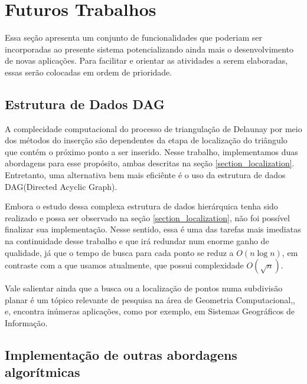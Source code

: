\documentclass[12pt,a4paper]{book}
\begin{document}
\section{Futuros Trabalhos}

Essa se\c{c}\~{a}o apresenta um conjunto de funcionalidades que poderiam ser incorporadas ao presente sistema potencializando ainda mais o desenvolvimento de novas aplica\c{c}\~{o}es. Para facilitar e orientar as atividades a serem elaboradas, essas ser\~ao colocadas em ordem de prioridade.

\subsection{Estrutura de Dados DAG}

A complecidade computacional do processo de triangula\c{c}\~{a}o de Delaunay por meio dos m\'etodos do inser\c{c}\~{a}o s\~ao dependentes da etapa de localiza\c{c}\~{a}o do tri\^angulo que cont\'em o pr\'oximo ponto a ser inserido. Nesse trabalho, implementamos duas abordagens para esse prop\'osito, ambas descritas na se\c{c}\~{a}o \ref{section_localization}. Entretanto, uma alternativa bem mais efici\^ente \'e o uso da estrutura de dados DAG(Directed Acyclic Graph)\cite{guibas}.

Embora o estudo dessa complexa estrutura de dados hier\'arquica tenha sido realizado e possa ser observado na se\c{c}\~{a}o \ref{section_localization}, n\~ao foi poss\'ivel finalizar sua implementa\c{c}\~{a}o. Nesse sentido, essa \'e uma das tarefas mais imediatas na continuidade desse trabalho e que ir\'a redundar num enorme ganho de qualidade, j\'a que o tempo de busca para cada ponto se reduz a $O(n \log n)$, em contraste com a que usamos atualmente, que possui complexidade $O(\sqrt{n})$.

Vale salientar ainda que a busca ou a localiza\c{c}\~{a}o de pontos numa subdivis\~ao planar \'e um t\'opico relevante de pesquisa na \'area de Geometria Computacional\cite{berg},\cite{preparata}, \cite{edelsbrunner2} e, encontra in\'umeras aplica\c{c}\~{o}es, como por exemplo, em Sistemas Geogr\'aficos de Informa\c{c}\~{a}o.

\subsection{Implementa\c{c}\~{a}o de outras abordagens algor\'itmicas}
\end{document}
